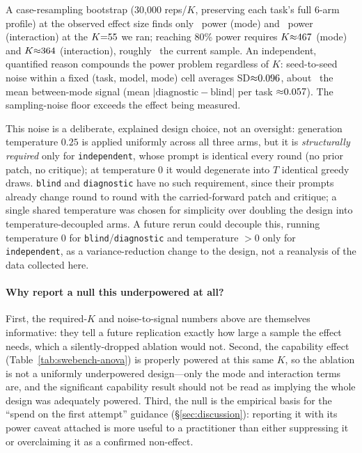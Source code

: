 A case-resampling bootstrap (30{,}000 reps/$K$, preserving each task's full 6-arm profile) at the observed effect size finds only \statPBModePower\ power (mode) and \statPBInterPower\ power (interaction) at the $K{=}55$ we ran; reaching 80\% power requires $K{\approx}467$ (mode) and $K{\approx}364$ (interaction), roughly \statPBPowerMultiple\ the current sample. An independent, quantified reason compounds the power problem regardless of $K$: seed-to-seed noise within a fixed (task, model, mode) cell averages SD${\approx}0.096$, about \statPBSignalOverNoise\ the mean between-mode signal (mean $|\text{diagnostic}-\text{blind}|$ per task ${\approx}0.057$). The sampling-noise floor exceeds the effect being measured.

This noise is a deliberate, explained design choice, not an oversight: generation temperature $0.25$ is applied uniformly across all three arms, but it is \emph{structurally required} only for \texttt{independent}, whose prompt is identical every round (no prior patch, no critique); at temperature $0$ it would degenerate into $T$ identical greedy draws. \texttt{blind} and \texttt{diagnostic} have no such requirement, since their prompts already change round to round with the carried-forward patch and critique; a single shared temperature was chosen for simplicity over doubling the design into temperature-decoupled arms. A future rerun could decouple this, running temperature $0$ for \texttt{blind}/\texttt{diagnostic} and temperature ${>}0$ only for \texttt{independent}, as a variance-reduction change to the design, not a reanalysis of the data collected here.

\paragraph{Why report a null this underpowered at all?} First, the required-$K$ and noise-to-signal numbers above are themselves informative: they tell a future replication exactly how large a sample the effect needs, which a silently-dropped ablation would not. Second, the capability effect (Table~\ref{tab:swebench-anova}) is properly powered at this same $K$, so the ablation is not a uniformly underpowered design---only the mode and interaction terms are, and the significant capability result should not be read as implying the whole design was adequately powered. Third, the null is the empirical basis for the ``spend on the first attempt'' guidance (\S\ref{sec:discussion}): reporting it with its power caveat attached is more useful to a practitioner than either suppressing it or overclaiming it as a confirmed non-effect.

